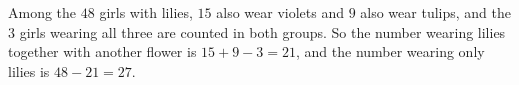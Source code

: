 Among the $48$ girls with lilies, $15$ also wear violets and $9$ also wear tulips, and the $3$ girls wearing all three are counted in both groups. So the number wearing lilies together with another flower is $15+9-3=21$, and the number wearing only lilies is $48-21=\boxed{27}$.
